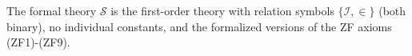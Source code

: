 The formal theory $\mathcal{S}$ is the first-order theory with relation symbols $\{\mathcal{I}, \in\}$ (both binary), no individual constants, and the formalized versions of the ZF axioms (ZF1)-(ZF9).
